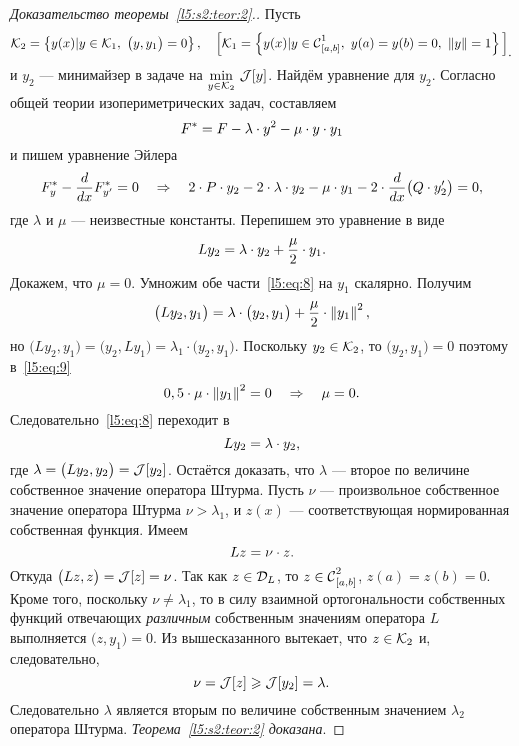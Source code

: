 \begin{proof}[Доказательство теоремы~\ref{l5:s2:teor:2}.] Пусть 
	\begin{equation*}
		\hfill\K_2=\left\{y(x)|y\in\K_1,\ \big(y,y_1\big)=0\right\},\quad\Big[\K_1=\left\{y(x)|y\in\Cfn[{[a,b]}]{1},\ y(a)=y(b)=0,\ \norm{y}=1\right\}\Big]_{\displaystyle.}\hfill
	\end{equation*} 
	и $y_2$ --- минимайзер в задаче на $\min\limits_{y\in\K_2}\,\J[y]$. Найдём уравнение для $y_2$. Согласно общей теории изопериметрических задач, составляем 
	\begin{equation*}
		\hfill F^{\ast}=F-\lambda\cdot y^2-\mu\cdot y\cdot y_1\hfill
	\end{equation*}
	и пишем уравнение Эйлера 
	\begin{equation*}
		\hfill F^{\ast}_y-\der{}{x}F^{\ast}_{y'}=0\quad\Rightarrow\quad 2\cdot P\cdot y_2-2\cdot\lambda\cdot y_2-\mu\cdot y_1-2\cdot\der{}{x}\big(Q\cdot y'_2\big)=0,\hfill
	\end{equation*}
	где $\lambda$ и $\mu$ --- неизвестные константы. Перепишем это уравнение в виде
	\begin{equation}
		\label{l5:eq:8}
		\hfill Ly_2=\lambda\cdot y_2+\frac{\mu}2\cdot y_1.\hfill
	\end{equation}
	Докажем, что $\mu=0$. Умножим обе части~\eqref{l5:eq:8} на $y_1$ скалярно. Получим
	\begin{equation}
		\label{l5:eq:9}
		\hfill\big(Ly_2,y_1\big)=\lambda\cdot\big(y_2,y_1\big)+\frac{\mu}{2}\cdot \norm{y_1}^2,\hfill
	\end{equation} 
	но $\big(Ly_2,y_1\big)=\big(y_2,Ly_1\big)=\lambda_1\cdot\big(y_2,y_1\big)$. Поскольку $y_2\in\K_2$, то $\big(y_2,y_1\big)=0$ поэтому в~\eqref{l5:eq:9}
	\begin{equation*}
		\hfill 0,5\cdot\mu\cdot\norm{y_1}^2=0\quad\Rightarrow\quad\mu=0.\hfill
	\end{equation*}
	Следовательно~\eqref{l5:eq:8} переходит в 
	\begin{equation*}
		\hfill Ly_2=\lambda\cdot y_2,\hfill
	\end{equation*}
	где $\lambda=\big(Ly_2,y_2\big)=\J[y_2]$. Остаётся доказать, что $\lambda$ --- второе по величине собственное значение оператора Штурма. Пусть $\nu$ --- произвольное собственное значение оператора Штурма $\nu>\lambda_1$, и $z(x)$ --- соответствующая нормированная собственная функция. Имеем 
	\begin{equation*}
		\hfill Lz=\nu\cdot z.\hfill
	\end{equation*}
	Откуда $\big(Lz,z\big)=\J[z]=\nu$. Так как $z\in\mc{D}_{L}$, то $z\in\Cfn[{[a,b]}]{2}$, $z(a)=z(b)=0$. Кроме того, поскольку $\nu\neq\lambda_1$, то в силу взаимной ортогональности собственных функций отвечающих \emph{различным} собственным значениям оператора $L$ выполняется $\big(z,y_1\big)=0$. Из вышесказанного вытекает, что $z\in\K_2$ и, следовательно,
	\begin{equation*}
		\hfill\nu=\J[z]\geqslant\J[y_2]=\lambda.\hfill
	\end{equation*} 
	Следовательно $\lambda$ является вторым по величине собственным значением $\lambda_2$ оператора Штурма. \emph{Теорема~\ref{l5:s2:teor:2} доказана}. 
\end{proof}
